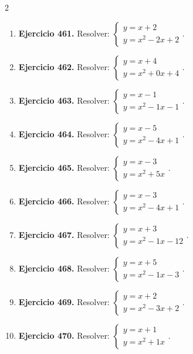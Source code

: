 \documentclass[10pt,a4paper]{article}
\begin{document}
\begin{multicols}{2}
\begin{enumerate}[label=\textbf{\arabic*.}]
\item \textbf{Ejercicio 461.} Resolver: \(\begin{cases}y=x+2\\y=x^2-2x+2\end{cases}\).
\item \textbf{Ejercicio 462.} Resolver: \(\begin{cases}y=x+4\\y=x^2+0x+4\end{cases}\).
\item \textbf{Ejercicio 463.} Resolver: \(\begin{cases}y=x-1\\y=x^2-1x-1\end{cases}\).
\item \textbf{Ejercicio 464.} Resolver: \(\begin{cases}y=x-5\\y=x^2-4x+1\end{cases}\).
\item \textbf{Ejercicio 465.} Resolver: \(\begin{cases}y=x-3\\y=x^2+5x\end{cases}\).
\item \textbf{Ejercicio 466.} Resolver: \(\begin{cases}y=x-3\\y=x^2-4x+1\end{cases}\).
\item \textbf{Ejercicio 467.} Resolver: \(\begin{cases}y=x+3\\y=x^2-1x-12\end{cases}\).
\item \textbf{Ejercicio 468.} Resolver: \(\begin{cases}y=x+5\\y=x^2-1x-3\end{cases}\).
\item \textbf{Ejercicio 469.} Resolver: \(\begin{cases}y=x+2\\y=x^2-3x+2\end{cases}\).
\item \textbf{Ejercicio 470.} Resolver: \(\begin{cases}y=x+1\\y=x^2+1x\end{cases}\).

\end{enumerate}
\end{multicols}
\end{document}
